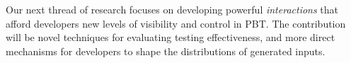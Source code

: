 



Our next thread of research focuses on developing powerful \emph{interactions} that afford developers new levels of visibility and control in PBT. The contribution will be novel techniques for evaluating testing effectiveness, and more direct mechanisms for developers to shape the distributions of generated inputs.

%
%

